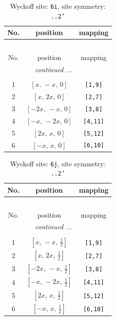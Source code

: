 \documentclass[fleqn,8pt]{jsarticle}
\begin{document}
\renewcommand{\arraystretch}{1.2}
\begin{longtable}{ccc}
\caption{Wyckoff site: {\tt 6i}, site symmetry: {\tt ..2'}}
 \\
 \hline \hline
No. & position & mapping \\ \hline \endfirsthead

\multicolumn{2}{l}{\tablename\ \thetable{}} \\
 \hline \hline
No. & position & mapping \\ \hline \endhead

 \hline \hline
\multicolumn{2}{r}{\footnotesize\it continued ...} \\ \endfoot

 \hline \hline
\multicolumn{2}{r}{} \\ \endlastfoot

1 & $\left[ x,\, - x,\, 0 \right]$ & {\tt [1,9]} \\ \hline
2 & $\left[ x,\, 2 x,\, 0 \right]$ & {\tt [2,7]} \\ \hline
3 & $\left[ - 2 x,\, - x,\, 0 \right]$ & {\tt [3,8]} \\ \hline
4 & $\left[ - x,\, - 2 x,\, 0 \right]$ & {\tt [4,11]} \\ \hline
5 & $\left[ 2 x,\, x,\, 0 \right]$ & {\tt [5,12]} \\ \hline
6 & $\left[ - x,\, x,\, 0 \right]$ & {\tt [6,10]} \\
\end{longtable}
\renewcommand{\arraystretch}{1.2}
\begin{longtable}{ccc}
\caption{Wyckoff site: {\tt 6j}, site symmetry: {\tt ..2'}}
 \\
 \hline \hline
No. & position & mapping \\ \hline \endfirsthead

\multicolumn{2}{l}{\tablename\ \thetable{}} \\
 \hline \hline
No. & position & mapping \\ \hline \endhead

 \hline \hline
\multicolumn{2}{r}{\footnotesize\it continued ...} \\ \endfoot

 \hline \hline
\multicolumn{2}{r}{} \\ \endlastfoot

1 & $\left[ x,\, - x,\, \frac{1}{2} \right]$ & {\tt [1,9]} \\ \hline
2 & $\left[ x,\, 2 x,\, \frac{1}{2} \right]$ & {\tt [2,7]} \\ \hline
3 & $\left[ - 2 x,\, - x,\, \frac{1}{2} \right]$ & {\tt [3,8]} \\ \hline
4 & $\left[ - x,\, - 2 x,\, \frac{1}{2} \right]$ & {\tt [4,11]} \\ \hline
5 & $\left[ 2 x,\, x,\, \frac{1}{2} \right]$ & {\tt [5,12]} \\ \hline
6 & $\left[ - x,\, x,\, \frac{1}{2} \right]$ & {\tt [6,10]} \\
\end{longtable}
\end{document}
